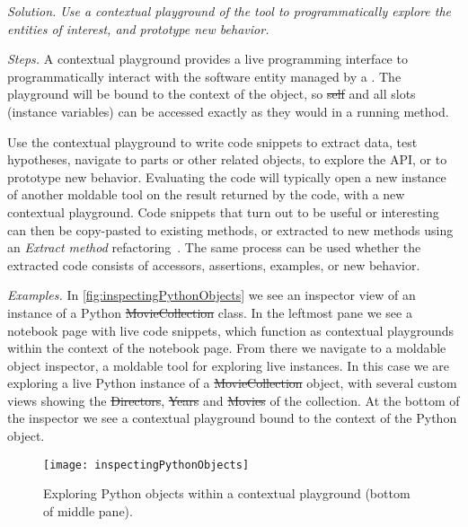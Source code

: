 \documentclass[sigconf,screen]{acmart}
\newcommand\tg[1]{\nbc{TG}{#1}{blue}}
\newcommand\cp[1]{\nbe{Cesare}{#1}{olive}} %
\newcommand{\patref}[1]{\emph{\nameref{pat:#1}}\xspace}
\newcommand{\patsec}[1]{\noindent\textit{#1.}\xspace}
\begin{document}
\patsec{Solution}
\emph{Use a contextual playground of the tool to programmatically explore the entities of interest, and prototype new behavior.}


\patsec{Steps}
A contextual playground provides a live programming interface to programmatically interact with the software entity managed by a \patref{MoldableTool}.
The playground will be bound to the context of the object, so \st{self} and all slots (\ie instance variables) can be accessed exactly as they would in a running method.

Use the contextual playground to write code snippets to extract data, test hypotheses, navigate to parts or other related objects, to explore the API, or to prototype new behavior.
Evaluating the code will typically open a new instance of another moldable tool on the result returned by the code, with a new contextual playground.
Code snippets that turn out to be useful or interesting can then be copy-pasted to existing methods, or extracted to new methods using an \emph{Extract method} refactoring~\cite{Fowl99a}.
The same process can be used whether the extracted code consists of accessors, assertions, examples, or new behavior.

\patsec{Examples}
In \autoref{fig:inspectingPythonObjects} we see an inspector view 
of an instance of a Python \st{MovieCollection} class.
In the leftmost pane we see a notebook page with live code snippets, which function as contextual playgrounds within the context of the notebook page.
From there we navigate to a moldable object inspector, a moldable tool for exploring live instances.
In this case we are exploring a live Python instance of a \st{MovieCollection} object, with several custom views showing the \st{Directors}, \st{Years} and \st{Movies} of the collection.
At the bottom of the inspector we see a contextual playground bound to the context of the Python object.

\begin{figure}[h]
  \texttt{[image: inspectingPythonObjects]}
  \caption{Exploring Python objects within a contextual playground (bottom of middle pane).}
  \label{fig:inspectingPythonObjects}
\end{figure}
\end{document}

